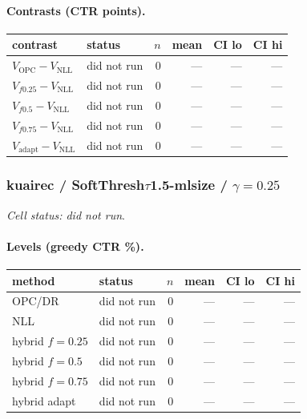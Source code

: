 \documentclass[10pt,a4paper]{article}
\begin{document}
\paragraph{Contrasts (CTR points).}
{\centering\small\begin{tabular}{llrrrr}
\toprule contrast & status & $n$ & mean & CI lo & CI hi \\
\midrule
$V_{\mathrm{OPC}}-V_{\mathrm{NLL}}$ & did not run & 0 & --- & --- & --- \\
$V_{f0.25}-V_{\mathrm{NLL}}$ & did not run & 0 & --- & --- & --- \\
$V_{f0.5}-V_{\mathrm{NLL}}$ & did not run & 0 & --- & --- & --- \\
$V_{f0.75}-V_{\mathrm{NLL}}$ & did not run & 0 & --- & --- & --- \\
$V_{\mathrm{adapt}}-V_{\mathrm{NLL}}$ & did not run & 0 & --- & --- & --- \\
\bottomrule\end{tabular}\par}
\bigskip
\subsubsection{kuairec / SoftThresh$\tau$1.5-mlsize / $\gamma=0.25$}
\emph{Cell status: did not run}.
\paragraph{Levels (greedy CTR \%).}
{\centering\small\begin{tabular}{llrrrr}
\toprule method & status & $n$ & mean & CI lo & CI hi \\
\midrule
OPC/DR & did not run & 0 & --- & --- & --- \\
NLL & did not run & 0 & --- & --- & --- \\
hybrid $f{=}0.25$ & did not run & 0 & --- & --- & --- \\
hybrid $f{=}0.5$ & did not run & 0 & --- & --- & --- \\
hybrid $f{=}0.75$ & did not run & 0 & --- & --- & --- \\
hybrid adapt & did not run & 0 & --- & --- & --- \\
\bottomrule\end{tabular}\par}
\end{document}
